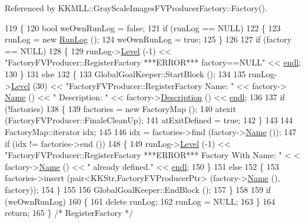 Referenced by K\+K\+M\+L\+L\+::\+Gray\+Scale\+Images\+F\+V\+Producer\+Factory\+::\+Factory().


\begin{DoxyCode}
119 \{
120   \textcolor{keywordtype}{bool}  weOwnRunLog = \textcolor{keyword}{false};
121   \textcolor{keywordflow}{if}  (runLog == NULL)
122   \{
123     runLog = \textcolor{keyword}{new} \hyperlink{class_k_k_b_1_1_run_log}{RunLog} ();
124     weOwnRunLog = \textcolor{keyword}{true};
125   \}
126 
127   \textcolor{keywordflow}{if}  (factory == NULL)
128   \{
129     runLog->\hyperlink{class_k_k_b_1_1_run_log_a32cf761d7f2e747465fd80533fdbb659}{Level} (-1) << \textcolor{stringliteral}{"FactoryFVProducer::RegisterFactory   ***ERROR***   factory==NULL"} << 
      \hyperlink{namespace_k_k_b_ad1f50f65af6adc8fa9e6f62d007818a8}{endl};
130   \}
131   \textcolor{keywordflow}{else}
132   \{
133     GlobalGoalKeeper::StartBlock ();
134 
135     runLog->\hyperlink{class_k_k_b_1_1_run_log_a32cf761d7f2e747465fd80533fdbb659}{Level} (30) << \textcolor{stringliteral}{"FactoryFVProducer::RegisterFactory  Name: "} << factory->
      \hyperlink{class_k_k_m_l_l_1_1_factory_f_v_producer_adbdfab027b335694c46d969d84ea1213}{Name} () << \textcolor{stringliteral}{"  Description: "} << factory->\hyperlink{class_k_k_m_l_l_1_1_factory_f_v_producer_a80d44a99f38097839c2be1b0c5db4c6a}{Description} () << \hyperlink{namespace_k_k_b_ad1f50f65af6adc8fa9e6f62d007818a8}{endl};
136 
137     \textcolor{keywordflow}{if}  (!factories)
138     \{
139       factories = \textcolor{keyword}{new} FactoryMap ();
140       atexit (FactoryFVProducer::FinaleCleanUp);
141       atExitDefined = \textcolor{keyword}{true};
142     \}
143 
144     FactoryMap::iterator idx;
145 
146     idx = factories->find (factory->\hyperlink{class_k_k_m_l_l_1_1_factory_f_v_producer_adbdfab027b335694c46d969d84ea1213}{Name} ());
147     \textcolor{keywordflow}{if}  (idx != factories->end ())
148     \{
149       runLog->\hyperlink{class_k_k_b_1_1_run_log_a32cf761d7f2e747465fd80533fdbb659}{Level} (-1) << \textcolor{stringliteral}{"FactoryFVProducer::RegisterFactory   ***ERROR***   Factory With Name: "} <
      < factory->\hyperlink{class_k_k_m_l_l_1_1_factory_f_v_producer_adbdfab027b335694c46d969d84ea1213}{Name} () << \textcolor{stringliteral}{" already defined."} << \hyperlink{namespace_k_k_b_ad1f50f65af6adc8fa9e6f62d007818a8}{endl};
150     \}
151     \textcolor{keywordflow}{else}
152     \{
153       factories->insert (pair<KKStr,FactoryFVProducerPtr> (factory->\hyperlink{class_k_k_m_l_l_1_1_factory_f_v_producer_adbdfab027b335694c46d969d84ea1213}{Name} (), factory));
154     \}
155 
156     GlobalGoalKeeper::EndBlock ();
157   \}
158 
159   \textcolor{keywordflow}{if}  (weOwnRunLog)
160   \{
161     \textcolor{keyword}{delete}  runLog;
162     runLog = NULL;
163   \}
164   \textcolor{keywordflow}{return};
165 \}  \textcolor{comment}{/* RegisterFactory */}
\end{DoxyCode}


